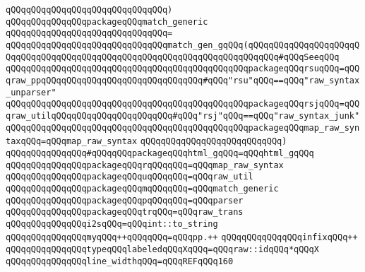 \verb|qQQqqQQqqQQqqQQqqQQqqQQqqQQqqQQq)|\newline
\newline
\verb|qQQqqQQqqQQqqQQqpackageqQQqmatch_generic|\newline
\verb|qQQqqQQqqQQqqQQqqQQqqQQqqQQqqQQq=|\newline
\verb|qQQqqQQqqQQqqQQqqQQqqQQqqQQqqQQqmatch_gen_gqQQq(qQQqqQQqqQQqqQQqqQQqqQQqqQQqqQQqqQQqqQQqqQQqqQQqqQQqqQQqqQQqqQQqqQQqqQQqqQQq#qQQqSeeqQQq|\newline
\verb|qQQqqQQqqQQqqQQqqQQqqQQqqQQqqQQqqQQqqQQqqQQqqQQqpackageqQQqrsuqQQq=qQQqraw_ppqQQqqQQqqQQqqQQqqQQqqQQqqQQqqQQq#qQQq"rsu"qQQq==qQQq"raw_syntax_unparser"|\newline
\verb|qQQqqQQqqQQqqQQqqQQqqQQqqQQqqQQqqQQqqQQqqQQqqQQqpackageqQQqrsjqQQq=qQQqraw_utilqQQqqQQqqQQqqQQqqQQqqQQq#qQQq"rsj"qQQq==qQQq"raw_syntax_junk"|\newline
\verb|qQQqqQQqqQQqqQQqqQQqqQQqqQQqqQQqqQQqqQQqqQQqqQQqpackageqQQqmap_raw_syntaxqQQq=qQQqmap_raw_syntax|\newline
\verb|qQQqqQQqqQQqqQQqqQQqqQQqqQQq)|\newline
\verb|qQQqqQQqqQQqqQQq#qQQqqQQqpackageqQQqhtml_gqQQq=qQQqhtml_gqQQq|\newline
\newline
\verb|qQQqqQQqqQQqqQQqpackageqQQqrqQQqqQQq=qQQqmap_raw_syntax|\newline
\verb|qQQqqQQqqQQqqQQqpackageqQQquqQQqqQQq=qQQqraw_util|\newline
\verb|qQQqqQQqqQQqqQQqpackageqQQqmqQQqqQQq=qQQqmatch_generic|\newline
\verb|qQQqqQQqqQQqqQQqpackageqQQqpqQQqqQQq=qQQqparser|\newline
\verb|qQQqqQQqqQQqqQQqpackageqQQqtrqQQq=qQQqraw_trans|\newline
\newline
\verb|qQQqqQQqqQQqqQQqi2sqQQq=qQQqint::to_string|\newline
\verb|qQQqqQQqqQQqqQQqmyqQQq++qQQqqQQq=qQQqpp.++|\newline
\verb|qQQqqQQqqQQqqQQqinfixqQQq++|\newline
\newline
\verb|qQQqqQQqqQQqqQQqtypeqQQqlabeledqQQqXqQQq=qQQqraw::idqQQq*qQQqX|\newline
\newline
\verb|qQQqqQQqqQQqqQQqline_widthqQQq=qQQqREFqQQq160|\newline
